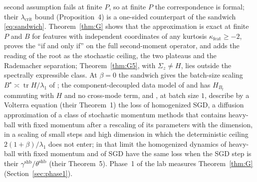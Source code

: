 \documentclass[11pt]{article}
\theoremstyle{remark}
\newcommand{\tr}{\operatorname{tr}}
\begin{document}
second assumption fails at finite $P$, so at finite $P$ the correspondence is formal; their $\lambda_{\mathrm{crit}}$ bound (Proposition~4) is a one-sided counterpart of the sandwich \eqref{eq:sandwich}. Theorem~\ref{thm:G} shows that the approximation is exact at finite $P$ and $B$ for features with independent coordinates of any kurtosis $\kappa_{\mathrm{feat}}\ge-2$, proves the ``if and only if'' on the full second-moment operator, and adds the reading of the root as the stochastic ceiling, the two plateaus and the Rademacher separation; Theorem~\ref{thm:G5}, with $\Sigma_z\ne H$, lies outside the spectrally expressible class. At $\beta=0$ the sandwich gives the batch-size scaling $B^\star\asymp\tr H/\lambda_1$ of \citet{ma2018power}; the component-decoupled data model of \citet{kidambi2018insufficiency} and \citet{liu2020mass} has $H_{B_t}$ commuting with $H$ and no cross-mode term, and \citet{paquette2021momentum}, at batch size $1$, describe by a Volterra equation (their Theorem~1) the loss of homogenized SGD, a diffusion approximation of a class of stochastic momentum methods that contains heavy-ball with fixed momentum after a rescaling of its parameters with the dimension, in a scaling of small steps and high dimension in which the deterministic ceiling $2(1+\beta)/\lambda_1$ does not enter; in that limit the homogenized dynamics of heavy-ball with fixed momentum and of SGD have the same loss when the SGD step is their $\gamma^{\mathrm{shb}}/\theta^{\mathrm{shb}}$ (their Theorem~5). Phase~1 of the lab measures Theorem~\ref{thm:G} (Section~\ref{sec:phase1}).
\end{document}
